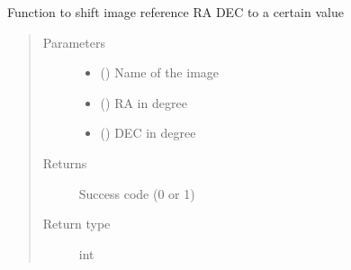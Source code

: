 \documentclass[letterpaper,10pt,english]{sphinxmanual}
\begin{document}
\begin{fulllineitems}
\begin{fulllineitems}
\label{\detokenize{paircars:paircars.intensity_selfcal_LTS.IntensitySelfcal.shift_phasecenter}}
\sphinxAtStartPar
Function to shift image reference RA DEC to a certain value
\begin{quote}\begin{description}
\item[{Parameters}] \leavevmode\begin{itemize}
\item {} 
\sphinxAtStartPar
{} () \textendash{} Name of the image

\item {} 
\sphinxAtStartPar
{} () \textendash{} RA in degree

\item {} 
\sphinxAtStartPar
{} () \textendash{} DEC in degree

\end{itemize}

\item[{Returns}] \leavevmode
\sphinxAtStartPar
Success code (0 or 1)

\item[{Return type}] \leavevmode
\sphinxAtStartPar
int

\end{description}\end{quote}

\end{fulllineitems}



\end{fulllineitems}
\end{document}

